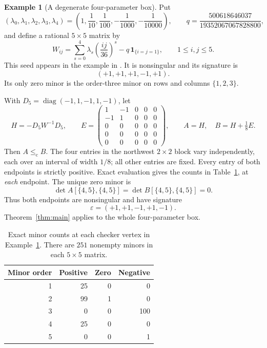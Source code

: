 \documentclass[11pt]{article}
\theoremstyle{definition}
\newtheorem{example}[theorem]{Example}
\theoremstyle{remark}
\numberwithin{equation}{section}
\newcommand{\eps}{\varepsilon}
\newcommand{\chle}{\leq_{\mathrm c}}
\DeclareMathOperator{\diag}{diag}
\begin{document}
\begin{example}[A degenerate four-parameter box]\label{ex:degenerate}
Put
\[
 (\lambda_0,\lambda_1,\lambda_2,\lambda_3,\lambda_4)
 =\left(1,\frac1{10},\frac1{100},-\frac1{1000},-\frac1{10000}\right),
 \qquad
 q=\frac{500618646037}{19352067067828800},
\]
and define a rational $5\times5$ matrix by
\begin{equation}\label{eq:seed}
 W_{ij}=\sum_{s=0}^4\lambda_s\left(\frac{ij}{36}\right)^s
             -q\,\mathbf 1_{\{i=j=1\}},
 \qquad 1\leq i,j\leq5.
\end{equation}
This seed appears in the example in
\cite[Section~6]{HoldenGraph2026}. It is nonsingular and its
signature is
\[
 (+1,+1,+1,-1,+1).
\]
Its only zero minor is the
order-three minor on rows and columns $\{1,2,3\}$.

With $D_5=\diag(-1,1,-1,1,-1)$, let
\begin{equation}\label{eq:example-box}
 H=-D_5W^{-1}D_5,\qquad
 E=\begin{pmatrix}
 1&-1&0&0&0\\-1&1&0&0&0\\
 0&0&0&0&0\\0&0&0&0&0\\0&0&0&0&0
 \end{pmatrix},\qquad
 A=H,\quad B=H+\tfrac18 E.
\end{equation}
Then $A\chle B$. The four entries in the northwest $2\times2$
block vary independently, each over an interval of width $1/8$;
all other entries are fixed. Every entry of both endpoints is
strictly positive. Exact evaluation gives the counts in
Table~\ref{tab:example}, at \emph{each} endpoint. The unique
zero minor is
\begin{equation}\label{eq:zero-example}
 \det A[\{4,5\},\{4,5\}]
 =\det B[\{4,5\},\{4,5\}]=0.
\end{equation}
Thus both endpoints are nonsingular and have signature
\[
 \eps=(+1,+1,-1,+1,-1).
\]
Theorem~\ref{thm:main} applies to the whole four-parameter box.

\begin{table}[htbp]
\centering
\begin{tabular}{rrrr}
\toprule
Minor order & Positive & Zero & Negative\\
\midrule
1 & 25 & 0 & 0\\
2 & 99 & 1 & 0\\
3 & 0 & 0 & 100\\
4 & 25 & 0 & 0\\
5 & 0 & 0 & 1\\
\bottomrule
\end{tabular}
\caption{Exact minor counts at each checker vertex in
Example~\ref{ex:degenerate}. There are $251$ nonempty minors
in each $5\times5$ matrix.}\label{tab:example}
\end{table}


\end{example}
\end{document}
